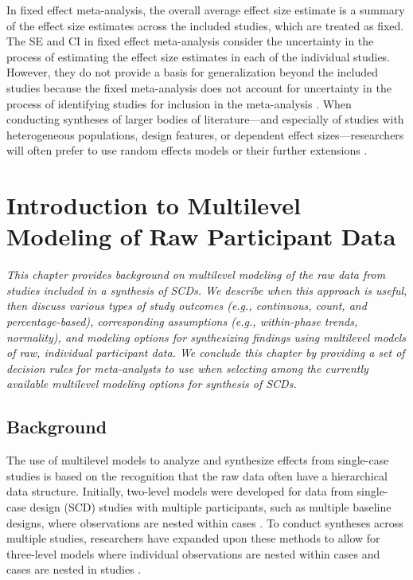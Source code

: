 \documentclass[
]{book}
\begin{document}
In fixed effect meta-analysis, the overall average effect size estimate is a summary of the effect size estimates across the included studies, which are treated as fixed. The SE and CI in fixed effect meta-analysis consider the uncertainty in the process of estimating the effect size estimates in each of the individual studies. However, they do not provide a basis for generalization beyond the included studies because the fixed meta-analysis does not account for uncertainty in the process of identifying studies for inclusion in the meta-analysis \citep{konstantopoulos2019statistically, Rice_Higgins_Lumley_2018}. When conducting syntheses of larger bodies of literature---and especially of studies with heterogeneous populations, design features, or dependent effect sizes---researchers will often prefer to use random effects models \citep{Hedges_Vevea_1998} or their further extensions \citep{PustejovskyTipton2021, van2013three}.

\hypertarget{MLM-raw-data}{%
\chapter{Introduction to Multilevel Modeling of Raw Participant Data}\label{MLM-raw-data}}

\emph{This chapter provides background on multilevel modeling of the raw data from studies included in a synthesis of SCDs.
We describe when this approach is useful, then discuss various types of study outcomes (e.g., continuous, count, and percentage-based), corresponding assumptions (e.g., within-phase trends, normality), and modeling options for synthesizing findings using multilevel models of raw, individual participant data.
We conclude this chapter by providing a set of decision rules for meta-analysts to use when selecting among the currently available multilevel modeling options for synthesis of SCDs.}

\hypertarget{background-2}{%
\section{Background}\label{background-2}}

The use of multilevel models to analyze and synthesize effects from single-case studies is based on the recognition that the raw data often have a hierarchical data structure.
Initially, two-level models were developed for data from single-case design (SCD) studies with multiple participants, such as multiple baseline designs, where observations are nested within cases \citep{Ferron_Bell_Hess_Rendina-Gobioff_Hibbard_2009, Shadish_Kyse_Rindskopf_2013, van2003combining}.
To conduct syntheses across multiple studies, researchers have expanded upon these methods to allow for three-level models where individual observations are nested within cases and cases are nested in studies \citep{Moeyaert_Ferron_Beretvas_VandenNoortgate_2014, Moeyaert_Ugille_Ferron_Beretvas_VandenNoortgate_2014, Owens_Ferron_2012, VandenNoortgate2008multilevel}.
\end{document}
